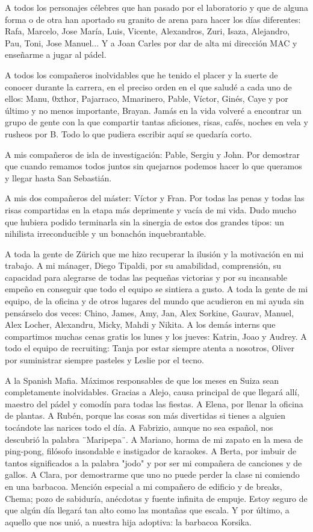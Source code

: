 A todos los personajes célebres que han pasado por el laboratorio y que de alguna forma o de otra han aportado su granito de arena para hacer los días diferentes: Rafa, Marcelo, Jose María, Luis, Vicente, Alexandros, Zuri, Isaza, Alejandro, Pau, Toni, Jose Manuel... Y a Joan Carles por dar de alta mi dirección MAC y enseñarme a jugar al pádel.

A todos los compañeros inolvidables que he tenido el placer y la suerte de conocer durante la carrera, en el preciso orden en el que saludé a cada uno de ellos: Manu, 0xthor, Pajarraco, Mmarinero, Pable, Víctor, Ginés, Caye y por último y no menos importante, Brayan. Jamás en la vida volveré a encontrar un grupo de gente con la que compartir tantas aficiones, risas, cafés, noches en vela y rusheos por B. Todo lo que pudiera escribir aquí se quedaría corto.

A mis compañeros de isla de investigación: Pable, Sergiu y John. Por demostrar que cuando remamos todos juntos sin quejarnos podemos hacer lo que queramos y llegar hasta San Sebastián.

A mis dos compañeros del máster: Víctor y Fran. Por todas las penas y todas las risas compartidas en la etapa más deprimente y vacía de mi vida. Dudo mucho que hubiera podido terminarla sin la sinergia de estos dos grandes tipos: un nihilista irreconducible y un bonachón inquebrantable.

A toda la gente de Zürich que me hizo recuperar la ilusión y la motivación en mi trabajo. A mi mánager, Diego Tipaldi, por su amabilidad, comprensión, su capacidad para alegrarse de todas las pequeñas victorias y por su incansable empeño en conseguir que todo el equipo se sintiera a gusto. A toda la gente de mi equipo, de la oficina y de otros lugares del mundo que acudieron en mi ayuda sin pensárselo dos veces: Chino, James, Amy, Jan, Alex Sorkine, Gaurav, Manuel, Alex Locher, Alexandru, Micky, Mahdi y Nikita. A los demás interns que compartimos muchas cenas gratis los lunes y los jueves: Katrin, Joao y Audrey. A todo el equipo de recruiting: Tanja por estar siempre atenta a nosotros, Oliver por suministrar siempre pasteles y Leslie por el tecno.

A la Spanish Mafia. Máximos responsables de que los meses en Suiza sean completamente inolvidables. Gracias a Alejo, causa principal de que llegará allí, maestro del pádel y comodín para todas las fiestas. A Elena, por llenar la oficina de plantas. A Rubén, porque las cosas son más divertidas si tienes a alguien tocándote las narices todo el día. A Fabrizio, aunque no sea español, nos descubrió la palabra ¨Maripepa¨. A Mariano, horma de mi zapato en la mesa de ping-pong, filósofo insondable e instigador de karaokes. A Berta, por imbuir de tantos significados a la palabra "jodo" y por ser mi compañera de canciones y de gallos. A Clara, por demostrarme que uno no puede perder la clase ni comiendo en una barbacoa. Mención especial a mi compañero de edificio y de breaks, Chema; pozo de sabiduría, anécdotas y fuente infinita de empuje. Estoy seguro de que algún día llegará tan alto como las montañas que escala. Y por último, a aquello que nos unió, a nuestra hija adoptiva: la barbacoa Korsika.

